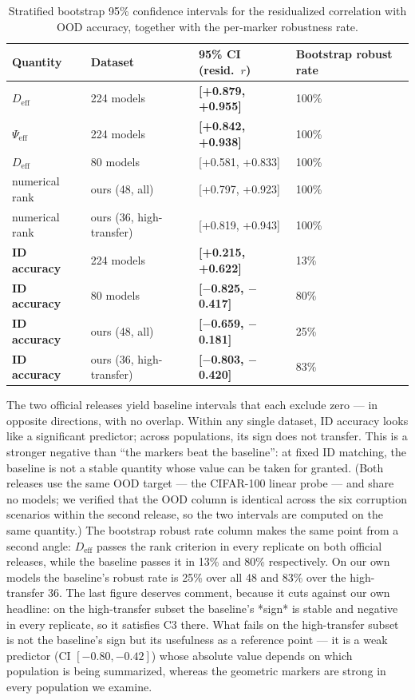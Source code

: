 \documentclass[10pt]{article} %
\begin{document}
\begin{table}[t]
\caption{Stratified bootstrap 95\% confidence intervals for the residualized correlation with OOD accuracy, together with the per-marker robustness rate.}
\label{tab:bootstrap}
\centering
\small
\setlength{\tabcolsep}{6pt}
\begin{tabular}{@{}p{2.6cm}p{3.3cm}p{3.6cm}p{3.4cm}@{}}
\hline
Quantity & Dataset & 95\% CI (resid.\ $r$) & Bootstrap robust rate \\
\hline
$D_{\mathrm{eff}}$ & 224 models & \textbf{[+0.879, +0.955]} & 100\% \\
\hline
$\Psi_{\mathrm{eff}}$ & 224 models & \textbf{[+0.842, +0.938]} & 100\% \\
\hline
$D_{\mathrm{eff}}$ & 80 models & [+0.581, +0.833] & 100\% \\
\hline
numerical rank & ours (48, all) & [+0.797, +0.923] & 100\% \\
\hline
numerical rank & ours (36, high-transfer) & [+0.819, +0.943] & 100\% \\
\hline
\textbf{ID accuracy} & 224 models & \textbf{[+0.215, +0.622]} & 13\% \\
\hline
\textbf{ID accuracy} & 80 models & \textbf{[$-$0.825, $-$0.417]} & 80\% \\
\hline
\textbf{ID accuracy} & ours (48, all) & \textbf{[$-$0.659, $-$0.181]} & 25\% \\
\hline
\textbf{ID accuracy} & ours (36, high-transfer) & \textbf{[$-$0.803, $-$0.420]} & 83\% \\
\hline
\end{tabular}
\end{table}

The two official releases yield baseline intervals that each exclude zero --- in opposite directions, with no overlap. Within any single dataset, ID accuracy looks like a significant predictor; across populations, its sign does not transfer. This is a stronger negative than ``the markers beat the baseline'': at fixed ID matching, the baseline is not a stable quantity whose value can be taken for granted. (Both releases use the same OOD target --- the CIFAR-100 linear probe --- and share no models; we verified that the OOD column is identical across the six corruption scenarios within the second release, so the two intervals are computed on the same quantity.) The bootstrap robust rate column makes the same point from a second angle: $D_{\mathrm{eff}}$ passes the rank criterion in every replicate on both official releases, while the baseline passes it in 13\% and 80\% respectively. On our own models the baseline's robust rate is 25\% over all 48 and 83\% over the high-transfer 36. The last figure deserves comment, because it cuts against our own headline: on the high-transfer subset the baseline's *sign* is stable and negative in every replicate, so it satisfies C3 there. What fails on the high-transfer subset is not the baseline's sign but its usefulness as a reference point --- it is a weak predictor (CI $[-0.80,-0.42]$) whose absolute value depends on which population is being summarized, whereas the geometric markers are strong in every population we examine.
\end{document}
